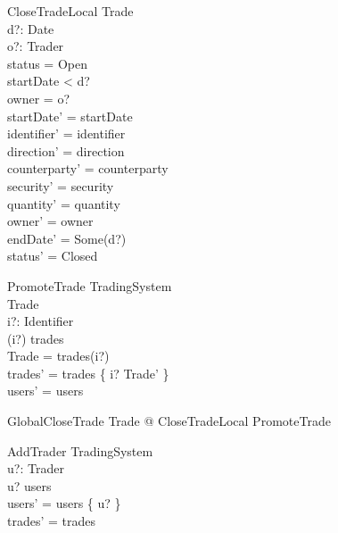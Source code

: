 \documentclass{article}
\begin{document}
\vspace{-0.4cm} 

\begin{schema}{CloseTradeLocal}
\Delta Trade \\
d?: Date \\ 
o?: Trader \\
\where
status = Open \\ 
startDate < d? \\
owner = o? \\
startDate' = startDate \\
identifier' = identifier \\
direction' = direction \\
counterparty' = counterparty \\
security' = security \\
quantity' = quantity \\
owner' =  owner \\
endDate' = Some(d?) \\ 
status' = Closed \\
\end{schema}

\vspace{-0.4cm} 

\begin{schema}{PromoteTrade}
\Delta TradingSystem \\
\Delta Trade \\
i?: Identifier \\
\where
(i?) \in \dom trades \\
\theta Trade = trades(i?) \\
trades' = trades \oplus \{ i? \mapsto \theta Trade' \} \\
users' = users \\
\end{schema}

\begin{zed}
GlobalCloseTrade  \exists \Delta Trade @ CloseTradeLocal \land PromoteTrade \\
\end{zed}

\vspace{-0.1cm} 

\begin{schema}{AddTrader}
\Delta TradingSystem \\
u?: Trader \\ 
\where
u? \notin users \\
users' = users \cup \{ u? \} \\
trades' = trades \\
\end{schema}
\end{document}
